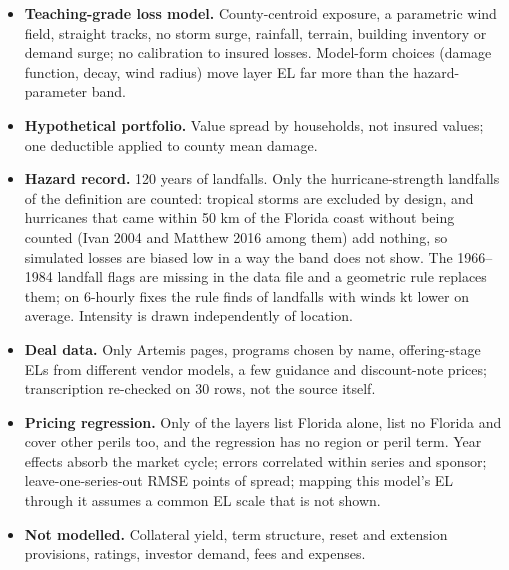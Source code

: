 \documentclass[12pt]{article}
\newcommand{\slide}[1]{\newpage{\color{accent}\Large\textbf{#1}}\par\vspace{2pt}{\color{accent}\rule{\linewidth}{1pt}}\par\vspace{4pt}}
\begin{document}
\slide{Limitations}
\begin{itemize}[itemsep=4pt]
\item \textbf{Teaching-grade loss model.} County-centroid exposure, a parametric wind field,
  straight tracks, no storm surge, rainfall, terrain, building inventory or demand surge; no
  calibration to insured losses. Model-form choices (damage function, decay, wind radius)
  move layer EL far more than the hazard-parameter band.
\item \textbf{Hypothetical portfolio.} Value spread by households, not insured values; one
  deductible applied to county mean damage.
\item \textbf{Hazard record.} 120 years of landfalls. Only the \numNLandfalls{} hurricane-strength
  landfalls of the definition are counted: tropical storms are excluded by design, and
  \numNearMiss{} hurricanes that came within 50 km of the Florida coast without being counted
  (Ivan 2004 and Matthew 2016 among them) add nothing, so simulated losses are biased low in a
  way the band does not show. The 1966--1984 landfall flags are missing in the data file and a
  geometric rule replaces them; on 6-hourly fixes the rule finds \numDefSynAgree{} of \numDefN{}
  landfalls with winds \numDefSynWind{} kt lower on average. Intensity is drawn independently of
  location.
\item \textbf{Deal data.} Only Artemis pages, programs chosen by name, offering-stage ELs from
  different vendor models, a few guidance and discount-note prices; transcription re-checked on
  30 rows, not the source itself.
\item \textbf{Pricing regression.} Only \numNFloridaOnly{} of the \numNLayers{} layers list
  Florida alone, \numNNoFlorida{} list no Florida and \numNMultiPeril{} cover other perils too,
  and the regression has no region or peril term. Year effects absorb the market cycle; errors
  correlated within series and sponsor; leave-one-series-out RMSE \numCVseriesPP{} points of spread; mapping this
  model's EL through it assumes a common EL scale that is not shown.
\item \textbf{Not modelled.} Collateral yield, term structure, reset and extension provisions,
  ratings, investor demand, fees and expenses.
\end{itemize}
\end{document}
